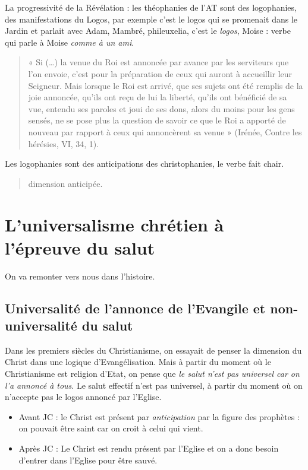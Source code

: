   
  La progressivité de la Révélation : les théophanies de l'AT sont des logophanies, des manifestations du Logos, par exemple c'est le logos qui se promenait dans le Jardin et parlait avec Adam, Mambré, phileuxelia, c'est le \textit{logos}, Moise : verbe qui parle à Moise \textit{comme à un ami}.
  \begin{quote}
      «  Si  (…)  la  venue  du  Roi  est  annoncée  par  avance  par  les  serviteurs  que  l’on  envoie,  c’est pour  la  préparation  de  ceux  qui  auront  à  accueillir  leur  Seigneur.  Mais  lorsque  le  Roi  est arrivé,  que  ses  sujets  ont  été  remplis  de  la  joie  annoncée,  qu’ils  ont  reçu  de  lui  la  liberté,  qu’ils ont  bénéficié  de  sa  vue,  entendu  ses  paroles  et  joui  de  ses  dons,  alors  du  moins  pour  les  gens sensés,  ne  se  pose  plus  la  question  de  savoir  ce  que  le  Roi  a  apporté  de  nouveau  par  rapport  à ceux qui  annoncèrent  sa  venue  »  (Irénée,  Contre  les  hérésies,  VI, 34, 1). 
  \end{quote}
  
  Les logophanies sont des anticipations des christophanies, le verbe fait chair.
  
  \begin{quote}
      dimension anticipée. 
  \end{quote}
  \section{L'universalisme chrétien à l'épreuve du salut} 

On va remonter vers nous dans l'histoire. 

    \subsection{Universalité de l'annonce de l'Evangile et non-universalité du
    salut}
    Dans les premiers siècles du Christianisme, on essayait de penser la dimension du Christ dans une logique d'Evangélisation. Mais à partir du moment où le Christianisme est religion d'Etat, on pense que \textit{le salut n'est pas universel car on l'a annoncé à tous}. Le salut effectif n'est pas universel, à partir du moment où on n'accepte pas le logos annoncé par l'Eglise.
    
    \begin{itemize}
        \item Avant JC : le Christ est présent par \textit{anticipation} par la figure des prophètes : on pouvait être saint car on croit à celui qui vient.
        \item Après JC : Le Christ est rendu présent par l'Eglise et on a donc besoin d'entrer dans l'Eglise pour être sauvé.
    \end{itemize}
    
